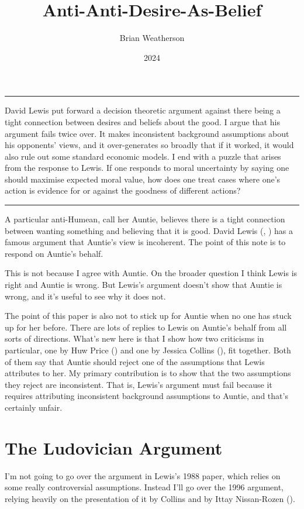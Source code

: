 \documentclass[
  10pt,
  letterpaper,
  DIV=11,
  numbers=noendperiod,
  twoside]{scrartcl}
\title{Anti-Anti-Desire-As-Belief}
\author{Brian Weatherson}
\date{2024}
\renewenvironment{abstract}
 {\vspace{-1.25cm}
 \quotation\small\noindent\rule{\linewidth}{.5pt}\par\smallskip
 \noindent }
 {\par\noindent\rule{\linewidth}{.5pt}\endquotation}
\begin{document}
\maketitle
\begin{abstract}
David Lewis put forward a decision theoretic argument against there
being a tight connection between desires and beliefs about the good. I
argue that his argument fails twice over. It makes inconsistent
background assumptions about his opponents' views, and it over-generates
so broadly that if it worked, it would also rule out some standard
economic models. I end with a puzzle that arises from the response to
Lewis. If one responds to moral uncertainty by saying one should
maximise expected moral value, how does one treat cases where one's
action is evidence for or against the goodness of different actions?
\end{abstract}

A particular anti-Humean, call her Auntie, believes there is a tight
connection between wanting something and believing that it is good.
David Lewis (,
) has a famous argument that Auntie's view
is incoherent. The point of this note is to respond on Auntie's behalf.

This is not because I agree with Auntie. On the broader question I think
Lewis is right and Auntie is wrong. But Lewis's argument doesn't show
that Auntie is wrong, and it's useful to see why it does not.

The point of this paper is also not to stick up for Auntie when no one
has stuck up for her before. There are lots of replies to Lewis on
Auntie's behalf from all sorts of directions. What's new here is that I
show how two criticisms in particular, one by Huw Price
() and one by Jessica Collins
(), fit together. Both of them say that
Auntie should reject one of the assumptions that Lewis attributes to
her. My primary contribution is to show that the two assumptions they
reject are inconsistent. That is, Lewis's argument must fail because it
requires attributing inconsistent background assumptions to Auntie, and
that's certainly unfair.

\section{The Ludovician Argument}\label{the-ludovician-argument}

I'm not going to go over the argument in Lewis's 1988 paper, which
relies on some really controversial assumptions. Instead I'll go over
the 1996 argument, relying heavily on the presentation of it by Collins
and by Ittay Nissan-Rozen ().
\end{document}
